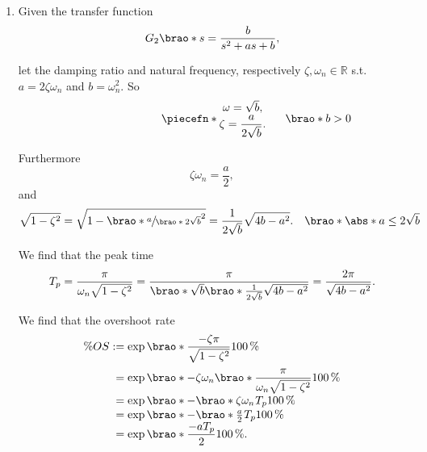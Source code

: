 \documentclass[12pt]{article}
\DeclarePairedDelimiter\brao()%
\DeclarePairedDelimiter\abs||
\DeclarePairedDelimiter\piecefn\{.
\begin{document}
\begin{enumerate}
    \item
        Given the transfer function
        \begin{equation}
            G_2\brao*s = \frac{b}{s^2 + as + b},
        \end{equation}
        
        let the damping ratio and natural frequency, respectively $\zeta, \omega_n \in \mathbb{R}$ s.t. $a = 2\zeta\omega_n$ and $b = \omega_n^2$. So
        \begin{equation}
            \piecefn*{
                \begin{matrix}
                    \omega = \sqrt{b}\rlap, \\*
                    \zeta = \dfrac{a}{2\sqrt{b}}\rlap. \\*
                \end{matrix}
            }\rlap{$\qquad\brao*{b > 0}$}
        \end{equation}

        Furthermore
        \begin{equation}
            \zeta\omega_n = \frac{a}2,
        \end{equation}
        and
        \begin{equation}
            \sqrt{1 - \zeta^2} = \sqrt{1 - \brao*{\sfrac{a}{\brao*{2\sqrt{b}}}}^2} = \frac{1}{2\sqrt{b}} \sqrt{4b - a^2}.%
            \hskip1em\brao*{\abs*{a} \leq 2\sqrt{b}}
        \end{equation}
        
        We find that the peak time
        \begin{equation}
            T_p = \frac\pi{\omega_n \sqrt{1 - \zeta^2}} = \frac\pi{\brao*{\sqrt{b}}\brao*{ \frac{1}{2\sqrt{b}}\sqrt{4b - a^2}}} = \frac{2\pi}{\sqrt{4b - a^2}}.
        \end{equation}

        We find that the overshoot rate
        \begin{equation}
            \begin{array}{*2{@{}r}@{}l@{}}
                \% OS
                &{}:={}& \exp\brao*{\dfrac{-\zeta\pi}{\sqrt{1 - \zeta^2}}} \SI{100}\percent
            \\*[1.3em]
                &{}={}& \exp\brao*{-\zeta\omega_n\brao*{\dfrac{\pi}{\omega_n\sqrt{1 - \zeta^2}}}} \SI{100}\percent
            \\*
                &{}={}& \exp\brao*{-\brao*{\zeta\omega_n}^{\vphantom{1}}T_p} \SI{100}\percent
            \\*
                &{}={}& \exp\brao*{-\brao*{\tfrac{a}2}^{\vphantom{1}}T_p} \SI{100}\percent
            \\*
                & {}={} & \exp\brao*{\dfrac{-aT_p}{2}} \SI{100}\percent\rlap.
            \\*
            \end{array}
        \end{equation}


\end{enumerate}
\end{document}

